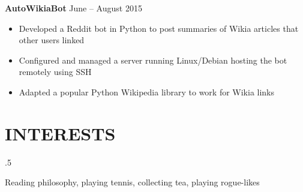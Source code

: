 \documentclass[overlapped,line]{res}
\begin{document}
\begin{resume}
\textbf{AutoWikiaBot} \hfill            June \--- August 2015
                  \begin{itemize}  \itemsep -2pt
                  \item Developed a Reddit bot in Python to post summaries of Wikia articles that other users linked
                  \item Configured and managed a server running Linux/Debian hosting the bot remotely using SSH
                  \item Adapted a popular Python Wikipedia library to work for Wikia links
                  \end{itemize}

\noindent\makebox[7.15in]{\rule{7.15in}{0.4pt}}

\section{INTERESTS} \moveleft.5\hoffset\centerline{Reading philosophy, playing tennis, collecting tea, playing rogue-likes}

\end{resume}
\end{document}
